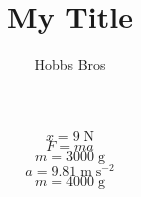 \documentclass[12pt]{article}
\begin{document}
\title{My Title}
\author{Hobbs Bros}
$$
x = 9 \; \mathrm{N}
$$
$$
F = m a
$$
$$
m = 3000 \; \mathrm{g}
$$
$$
a = 9.81 \; \mathrm{m} \; \mathrm{s^{-2}}
$$
$$
m = 4000 \; \mathrm{g}
$$
\end{document}

